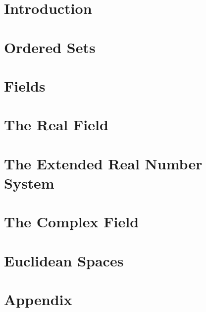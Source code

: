 
\section{Introduction}\label{sec:introduction}


\section{Ordered Sets}\label{sec:ordered-sets}


\section{Fields}\label{sec:fields}


\section{The Real Field}\label{sec:the-real-field}


\section{The Extended Real Number System}\label{sec:the-extended-real-number-system}


\section{The Complex Field}\label{sec:the-complex-field}


\section{Euclidean Spaces}\label{sec:euclidean-spaces}


\section{Appendix}\label{sec:appendix}

